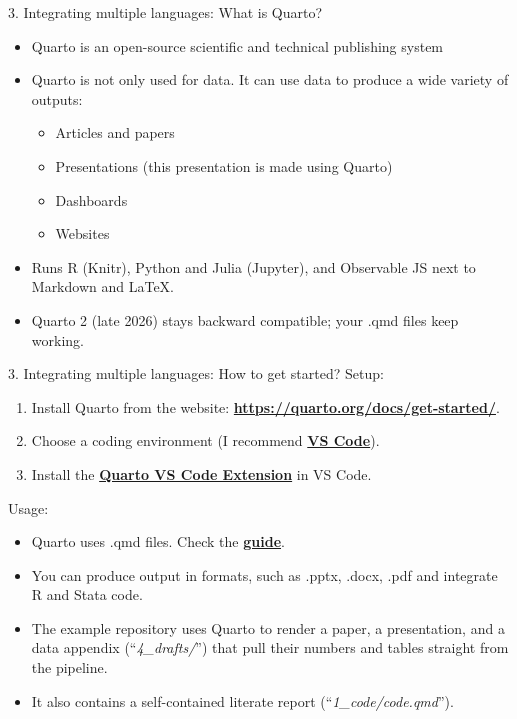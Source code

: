 \documentclass[
  ignorenonframetext,
  aspectratio=169,
]{beamer}
\providecommand{\tightlist}{%
  \setlength{\itemsep}{0pt}\setlength{\parskip}{0pt}}
\begin{document}
\begin{frame}{3. Integrating multiple languages: What is Quarto?}
\label{integrating-multiple-languages-what-is-quarto}
\begin{itemize}
\tightlist
\item
  Quarto is an open-source scientific and technical publishing system
\item
  Quarto is not only used for data. It can use data to produce a wide
  variety of outputs:

  \begin{itemize}
  \tightlist
  \item
    Articles and papers
  \item
    Presentations (this presentation is made using Quarto)
  \item
    Dashboards
  \item
    Websites
  \end{itemize}
\item
  Runs R (Knitr), Python and Julia (Jupyter), and Observable JS next to
  Markdown and LaTeX.
\item
  Quarto 2 (late 2026) stays backward compatible; your .qmd files keep
  working.
\end{itemize}
\end{frame}

\begin{frame}{3. Integrating multiple languages: How to get started?}
\label{integrating-multiple-languages-how-to-get-started}
Setup:

\begin{enumerate}
\tightlist
\item
  Install Quarto from the website:
  \href{https://quarto.org/docs/get-started/}{\textbf{https://quarto.org/docs/get-started/}}.
\item
  Choose a coding environment (I recommend
  \href{https://quarto.org/docs/get-started/hello/vscode.html}{\textbf{VS
  Code}}).
\item
  Install the
  \href{https://marketplace.visualstudio.com/items?itemName=quarto.quarto}{\textbf{Quarto
  VS Code Extension}} in VS Code.
\end{enumerate}

Usage:

\begin{itemize}
\tightlist
\item
  Quarto uses .qmd files. Check the
  \href{https://quarto.org/docs/guide/}{\textbf{guide}}.
\item
  You can produce output in formats, such as .pptx, .docx, .pdf and
  integrate R and Stata code.
\item
  The example repository uses Quarto to render a paper, a presentation,
  and a data appendix (``\emph{4\_drafts/}'') that pull their numbers
  and tables straight from the pipeline.
\item
  It also contains a self-contained literate report
  (``\emph{1\_code/code.qmd}'').
\end{itemize}
\end{frame}
\end{document}
